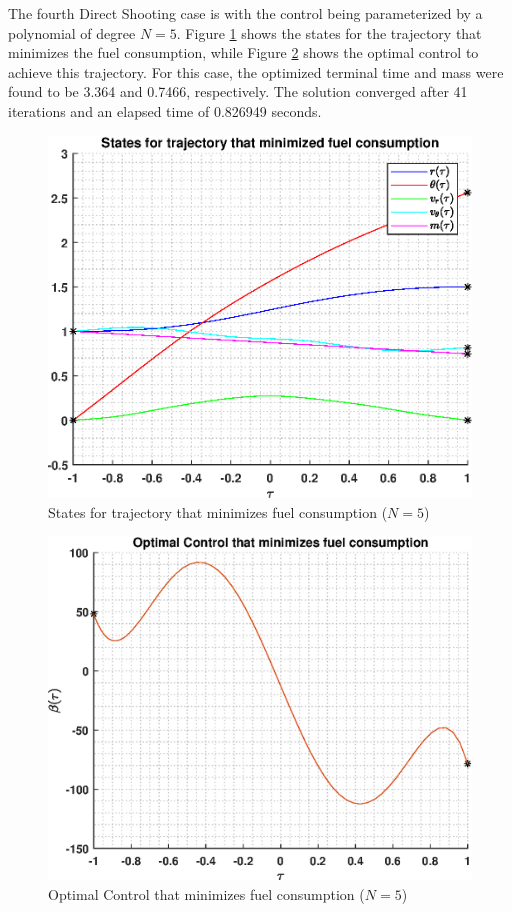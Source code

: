\documentclass[]{article}
\begin{document}
The fourth Direct Shooting case is with the control being parameterized by a polynomial of degree \(N = 5\). Figure \ref{fig:directStatesPoly5} shows the states for the trajectory that minimizes the fuel consumption, while Figure \ref{fig:directControlPoly5} shows the optimal control to achieve this trajectory. For this case, the optimized terminal time and mass were found to be 3.364 and 0.7466, respectively. The solution converged after 41 iterations and an elapsed time of 0.826949 seconds.
\begin{figure}
	\centering
	\includegraphics[scale=0.75]{directStatesPoly5.eps}
	\caption{States for trajectory that minimizes fuel consumption (\(N = 5\))}
	\label{fig:directStatesPoly5}
\end{figure}
\begin{figure}
	\centering
	\includegraphics[scale=0.75]{directControlPoly5.eps}
	\caption{Optimal Control that minimizes fuel consumption (\(N = 5\))}
	\label{fig:directControlPoly5}
\end{figure}
\FloatBarrier
\end{document}
